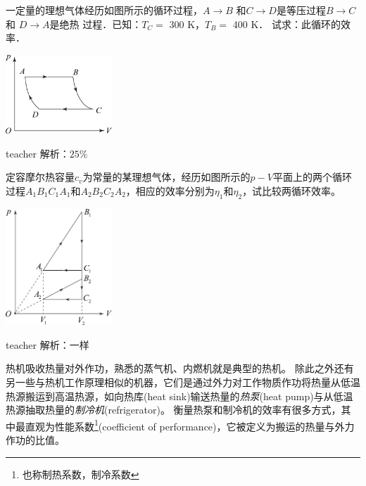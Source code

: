 \begin{example}
	一定量的理想气体经历如图所示的循环过程，$A\rightarrow B$ 和$C\rightarrow D$是等压过程$B\rightarrow C$和 $D\rightarrow A$是绝热 过程．已知：$T_C=$ 300 K，$T_B=$ 400 K． 试求：此循环的效率．
		\begin{flushright}
			\includegraphics[width = 0.3\textwidth]{images/thermal-13.pdf} 
		\end{flushright}
	\begin{taggedblock}{teacher}
	\noindent
		解析：$25\%$
	\end{taggedblock}
\end{example}

\begin{example}
	定容摩尔热容量$c_v$为常量的某理想气体，经历如图所示的$ p-V$平面上的两个循环过程$A_1B_1C_1A_1$和$A_2B_2C_2A_2$，相应的效率分别为$\eta_1$和$\eta_2$，试比较两循环效率。
	\begin{flushright}
		\includegraphics[width = 0.3\textwidth]{images/thermal-14.pdf} 
	\end{flushright}
	\begin{taggedblock}{teacher}
		\noindent
		解析：一样
	\end{taggedblock}
\end{example}


热机吸收热量对外作功，熟悉的蒸气机、内燃机就是典型的热机。
除此之外还有另一些与热机工作原理相似的机器，它们是通过外力对工作物质作功将热量从低温热源搬运到高温热源，如向{\heiti 热库}(heat sink)输送热量的\emph{热泵}(heat pump)与从低温热源抽取热量的\emph{制冷机}(refrigerator)。
衡量热泵和制冷机的效率有很多方式，其中最直观为{\heiti 性能系数}\footnote{也称制热系数，制冷系数}(coefficient of performance)，它被定义为搬运的热量与外力作功的比值。

